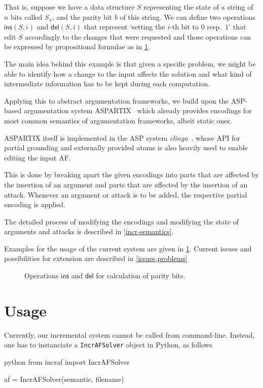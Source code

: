 \documentclass[oneside,12pt]{amsart}
\begin{document}
That is, suppose we have a data structure $S$ representing the state of a
string of $n$ bits called $S_x$, and the parity bit $b$ of this string.
We can define two operations $\mathsf{ins}(S,i)$ and $\mathsf{del}(S,i)$ 
that represent `setting the $i$-th bit to $0$ resp.\ $1$' that edit $S$ 
accordingly to the changes that were requested and those operations 
can be expressed by propositional formulae as in \cref{dynfo-parity}.

The main idea behind this example is that given a specific problem, we 
might be able to identify how a change to the input affects the solution 
and what kind of intermediate information has to be kept during each computation.

Applying this to abstract argumentation frameworks, we build upon the 
ASP-based argumentation system ASPARTIX~\cite{aspartix_website,aspartix} which already 
provides encodings for most common semantics of argumentation frameworks, albeit static ones.

ASPARTIX itself is implemented in the ASP system \emph{clingo}~\cite{clingo,potassco}, whose API 
for partial grounding and externally provided atoms is also heavily used 
to enable editing the input AF.

This is done by breaking apart the given encodings into parts that are affected
by the insertion of an argument and parts that are affected by the 
insertion of an attack. Whenever an argument or attack is to be added,
the respective partial encoding is applied. 

The detailed process of modifying the encodings and modifying 
the state of arguments and attacks is described in \cref{incr-semantics}.

Examples for the usage of the current system are given in \cref{usage}.
Current issues and possibilities for extension are described in \cref{issues,problems}

\begin{figure}
    
    \caption{Operations $\mathsf{ins}$ and $\mathsf{del}$ for calculation of parity bits.}
    \label{dynfo-parity}
\end{figure}

\section{Usage}\label{usage}
Currently, our incremental system cannot be called from command-line. Instead, one has to 
instanciate a \texttt{IncrAFSolver} object in Python, as follows
\begin{mintedbox}{python}
from incraf import IncrAFSolver

af = IncrAFSolver(semantic, filename)\end{mintedbox}
\end{document}
